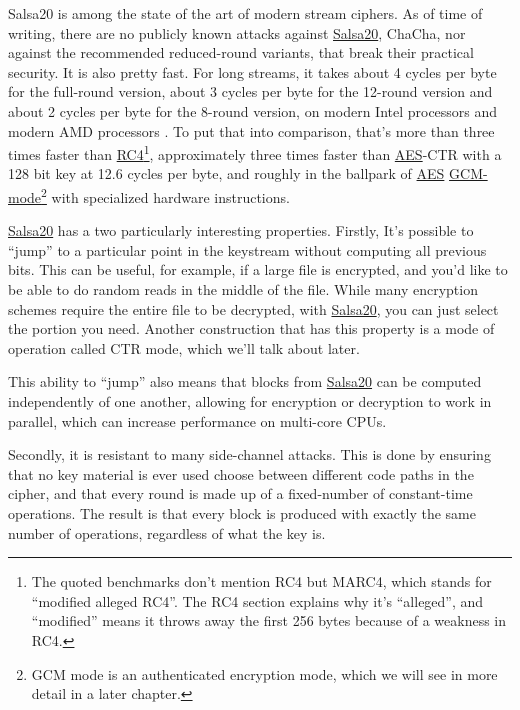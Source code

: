 \documentclass[11pt,ebook,table,dvipsnames]{memoir}
\begin{document}
Salsa20 is among the state of the art of modern stream
ciphers. As of time of writing, there are no publicly known attacks
against \hyperref[Salsa20]{Salsa20}, ChaCha, nor against the recommended reduced-round
variants, that break their practical security. It is also pretty fast.
For long streams, it takes about 4 cycles per byte for the full-round
version, about 3 cycles per byte for the 12-round version and about 2
cycles per byte for the 8-round version, on modern Intel processors
\cite{salsa20:speed} and modern AMD processors \cite{cryptopp:bench}.
To put that into comparison, that's more than three times faster than
\hyperref[RC4]{RC4}\footnote{The quoted benchmarks don't mention RC4 but MARC4, which
stands for \enquote{modified alleged RC4}. The RC4 section explains why it's
\enquote{alleged}, and \enquote{modified} means it throws away the first 256 bytes
because of a weakness in RC4.}, approximately three times faster than
\hyperref[AES]{AES}-CTR with a 128 bit key at 12.6 cycles per byte, and roughly in the
ballpark of \hyperref[AES]{AES} \hyperref[GCM mode]{GCM-mode}\footnote{GCM mode is an authenticated encryption
mode, which we will see in more detail in a later chapter.} with
specialized hardware instructions.

\label{keystream-jump}
\hyperref[Salsa20]{Salsa20} has a two particularly interesting properties. Firstly, It's
possible to \enquote{jump} to a particular point in the keystream without
computing all previous bits. This can be useful, for example, if a
large file is encrypted, and you'd like to be able to do random reads
in the middle of the file. While many encryption schemes require the
entire file to be decrypted, with \hyperref[Salsa20]{Salsa20}, you can just select the
portion you need. Another construction that has this property is a
mode of operation called \gls{CTR mode}, which we'll talk about later.

This ability to \enquote{jump} also means that blocks from \hyperref[Salsa20]{Salsa20} can be
computed independently of one another, allowing for encryption or
decryption to work in parallel, which can increase performance on
multi-core CPUs.

Secondly, it is resistant to many side-channel attacks. This is
done by ensuring that no key material is ever used choose between
different code paths in the cipher, and that every round is made up
of a fixed-number of constant-time operations. The result is that
every block is produced with exactly the same number of operations,
regardless of what the key is.
\end{document}
